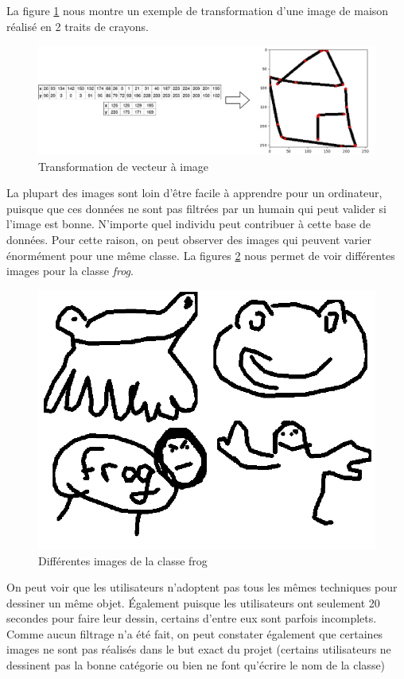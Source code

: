 


La figure \ref{transformationimage} nous montre un exemple de transformation d'une image de maison réalisé en 2 traits de crayons. 

\begin{figure}[h]
	\includegraphics[width=\linewidth]{images/Transformations_horizontal.pdf} %
	\caption{Transformation de vecteur à image} %
	\label{transformationimage} 
\end{figure}

La plupart des images sont loin d'être facile à apprendre pour un ordinateur, puisque que ces données ne sont pas filtrées par un humain qui peut valider si l'image est bonne. N'importe quel individu peut contribuer à cette base de données. Pour cette raison, on peut observer des images qui peuvent varier énormément pour une même classe. La figures \ref{frogs} nous permet de voir différentes images pour la classe \emph{frog}.



\begin{figure}[h]
	\includegraphics[width=\linewidth]{images/Combo_frogs.png} %
	\caption{Différentes images de la classe frog} %
	\label{frogs} 
\end{figure}


On peut voir que les utilisateurs n'adoptent pas tous les mêmes techniques pour dessiner un même objet. Également puisque les utilisateurs ont seulement 20 secondes pour faire leur dessin, certains d'entre eux sont parfois incomplets. Comme aucun filtrage n'a été fait, on peut constater également que certaines images ne sont pas réalisés dans le but exact du projet (certains utilisateurs ne dessinent pas la bonne catégorie ou bien ne font qu'écrire le nom de la classe)
